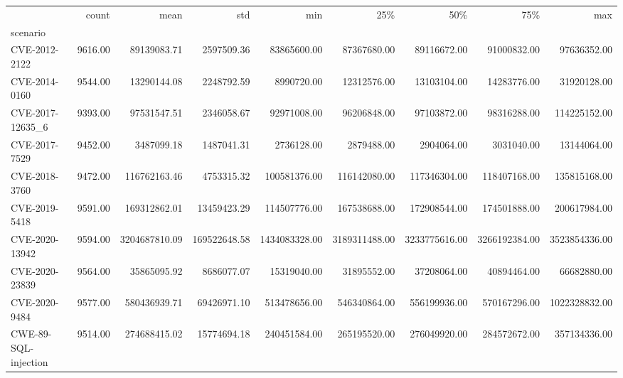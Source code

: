 \begin{tabular}{lrrrrrrrr}
\toprule
{} &   count &          mean &          std &           min &           25\% &           50\% &           75\% &           max \\
scenario             &         &               &              &               &               &               &               &               \\
\midrule
CVE-2012-2122        & 9616.00 &   89139083.71 &   2597509.36 &   83865600.00 &   87367680.00 &   89116672.00 &   91000832.00 &   97636352.00 \\
CVE-2014-0160        & 9544.00 &   13290144.08 &   2248792.59 &    8990720.00 &   12312576.00 &   13103104.00 &   14283776.00 &   31920128.00 \\
CVE-2017-12635\_6     & 9393.00 &   97531547.51 &   2346058.67 &   92971008.00 &   96206848.00 &   97103872.00 &   98316288.00 &  114225152.00 \\
CVE-2017-7529        & 9452.00 &    3487099.18 &   1487041.31 &    2736128.00 &    2879488.00 &    2904064.00 &    3031040.00 &   13144064.00 \\
CVE-2018-3760        & 9472.00 &  116762163.46 &   4753315.32 &  100581376.00 &  116142080.00 &  117346304.00 &  118407168.00 &  135815168.00 \\
CVE-2019-5418        & 9591.00 &  169312862.01 &  13459423.29 &  114507776.00 &  167538688.00 &  172908544.00 &  174501888.00 &  200617984.00 \\
CVE-2020-13942       & 9594.00 & 3204687810.09 & 169522648.58 & 1434083328.00 & 3189311488.00 & 3233775616.00 & 3266192384.00 & 3523854336.00 \\
CVE-2020-23839       & 9564.00 &   35865095.92 &   8686077.07 &   15319040.00 &   31895552.00 &   37208064.00 &   40894464.00 &   66682880.00 \\
CVE-2020-9484        & 9577.00 &  580436939.71 &  69426971.10 &  513478656.00 &  546340864.00 &  556199936.00 &  570167296.00 & 1022328832.00 \\
CWE-89-SQL-injection & 9514.00 &  274688415.02 &  15774694.18 &  240451584.00 &  265195520.00 &  276049920.00 &  284572672.00 &  357134336.00 \\
\bottomrule
\end{tabular}
